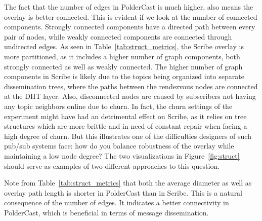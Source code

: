 The fact that the number of edges in PolderCast is much higher, also
means the overlay is better connected. This is evident if we look at the
number of connected components. Strongly connected components have a
directed path between every pair of nodes, while weakly connected
components are connected through undirected edges. As seen in
Table~\ref{tab:struct_metrics}, the Scribe overlay is more partitioned,
as it includes a higher number of graph components, both strongly
connected as well as weakly connected. The higher number of graph
components in Scribe is likely due to the topics being organized into
separate dissemination trees, where the paths between the rendezvous
nodes are connected at the DHT layer. Also, disconnected nodes are
caused by subscribers not having any topic neighbors online due to
churn. In fact, the churn settings of the experiment might have had an
detrimental effect on Scribe, as it relies on tree structures which are more
brittle and in need of constant repair when facing a high degree of
churn. But this illustrates one of the difficulties designers of such
pub/sub systems face: how do you balance robustness of the overlay while
maintaining a low node degree? The two visualizations in
Figure~\ref{fig:struct} should serve as examples of two different
approaches to this question.

Note from Table~\ref{tab:struct_metrics} that both the average diameter
as well as overlay path length is shorter in PolderCast than in Scribe. This is
a natural consequence of the number of edges. It indicates a better
connectivity in PolderCast, which is beneficial in terms of message
dissemination.

